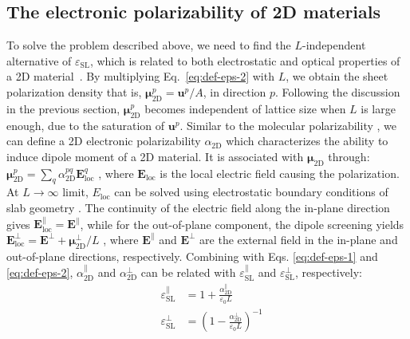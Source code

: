 \subsection{The electronic polarizability of 2D materials}
\label{sec:electr-polar-2d}

To solve the problem described above, we need to find the
$L$-independent alternative of $\varepsilon_{\mathrm{SL}}$, which is
related to both electrostatic and optical properties of a 2D
material~\cite{Matthes_2016}. By multiplying Eq.~\ref{eq:def-eps-2}
with $L$, we obtain the sheet polarization density that is,
$\boldsymbol{\mu}_{\mathrm{2D}}^{p} =\boldsymbol{u}^{p}/A$, in
direction $p$. Following the discussion in the previous section,
$\boldsymbol{\mu}_{\mathrm{2D}}^{p}$ becomes independent of lattice
size when $L$ is large enough, due to the saturation of
$\boldsymbol{u}^{p}$.
%
Similar to the molecular polarizability \cite{Israelachvili_2011}, we
can define a 2D electronic polarizability $\alpha_{\mathrm{2D}}$ which
characterizes the ability to induce dipole moment of a 2D material. It
is associated with $\boldsymbol{\mu}_{\mathrm{2D}}$ through:
$\boldsymbol{\mu}_{\mathrm{2D}}^{p} = \sum_{q}
\alpha_{\mathrm{2D}}^{pq} \boldsymbol{E}_{\mathrm{loc}}^{q}$
\cite{T_bik_2004}, where $\boldsymbol{E}_{\mathrm{loc}}$ is the local
electric field causing the polarization. At $L \rightarrow \infty$
limit, $E_{\mathrm{loc}}$ can be solved using electrostatic boundary
conditions of slab geometry \cite{Markel_2016}. The continuity of the
electric field along the in-plane direction gives
$\boldsymbol{E}^{\parallel}_{\mathrm{loc}}=\boldsymbol{E}^{\parallel}$,
while for the out-of-plane component, the dipole screening yields
$\boldsymbol{E}_{\mathrm{loc}}^{\perp}=\boldsymbol{E}^{\perp}+\boldsymbol{\mu}_{\mathrm{2D}}^{\perp}/L$
\cite{Meyer_2001_dipole_slab,T_bik_2004}, where
$\boldsymbol{E}^{\parallel}$ and $\boldsymbol{E}^{\perp}$ are the
external field in the in-plane and out-of-plane directions,
respectively. Combining with Eqs. \ref{eq:def-eps-1} and
\ref{eq:def-eps-2},
$\alpha_{\mathrm{2D}}^{\parallel}$ and $\alpha_{\mathrm{2D}}^{\perp}$
can be related with $\varepsilon_{\mathrm{SL}}^{\parallel}$ and
$\varepsilon_{\mathrm{SL}}^{\perp}$, respectively:
%
%
\begin{subequations}
\begin{eqnarray}
  \label{eq:alpha-para-def}
  &\varepsilon_{\mathrm{SL}}^{\parallel} &= 1 + \frac{\alpha_{\mathrm{2D}}^{\parallel}}{\varepsilon_{0}L}\\
  \label{eq:alpha-perp-def}
  &\varepsilon_{\mathrm{SL}}^{\perp} &= \left(1 - {\displaystyle \frac{\alpha_{\mathrm{2D}}^{\perp}}{\varepsilon_{\mathrm{0}} L}} \right)^{-1}
\end{eqnarray}
\end{subequations}


